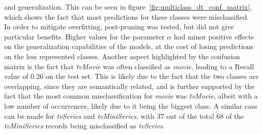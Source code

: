 and generalization. This can be seen in figure~\ref{fig:multiclass_dt_conf_matrix}, which shows the fact
that most predictions for these classes were misclassified.\\
In order to mitigate overfitting, post-pruning was tested, but did not give particular benefits.
Higher values for the parameter $\alpha$ had minor positive effects on the generalization
capabilities of the models, at the cost of losing predictions on the less represented classes.
Another aspect highlighted by the confusion matrix is the fact that \textit{tvMovie} was often
classified as \textit{movie}, leading to a Recall value of 0.26 on the test set.
This is likely due to the fact that the two classes are overlapping, since they are semantically related,
and is further supported by the fact that the most common misclassification for \textit{movie} was
\textit{tvMovie}, albeit with a low number of occurrences, likely due to it being the biggest class.
A similar case can be made for \textit{tvSeries} and \textit{tvMiniSeries}, with 37 out of the total 68
of the \textit{tvMiniSeries} records being misclassified as \textit{tvSeries}.



